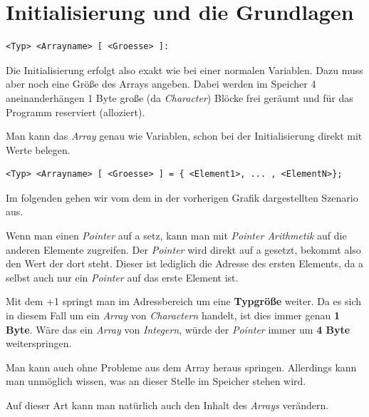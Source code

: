 \documentclass[c_worksheet.tex]{subfiles}
\begin{document}
\section{Initialisierung und die Grundlagen} 

\begin{lstlisting}
<Typ> <Arrayname> [ <Groesse> ]:
\end{lstlisting}

Die Initialisierung erfolgt also exakt wie bei einer normalen Variablen. Dazu muss aber noch eine Größe des Arrays angeben. Dabei werden im Speicher 4 aneinanderhängen 1 Byte große (da \emph{Character}) Blöcke frei geräumt und für das Programm reserviert (alloziert).

Man kann das \emph{Array} genau wie Variablen, schon bei der Initialisierung direkt mit Werte belegen.

\begin{lstlisting}
<Typ> <Arrayname> [ <Groesse> ] = { <Element1>, ... , <ElementN>};
\end{lstlisting}

Im folgenden gehen wir vom dem in der vorherigen Grafik dargestellten Szenario aus.

 

Wenn man einen \emph{Pointer} auf a setz, kann man mit \emph{Pointer Arithmetik} auf die anderen Elemente zugreifen. Der \emph{Pointer} wird direkt auf a gesetzt, bekommt also den Wert der dort steht. Dieser ist lediglich die Adresse des ersten Elements, da a selbst auch nur ein \emph{Pointer} auf das erste Element ist.

 

Mit dem +1 springt man im Adressbereich um eine \textbf{Typgröße} weiter. Da es sich in diesem Fall um ein \emph{Array} von \emph{Charactern} handelt, ist dies immer genau \textbf{1 Byte}. Wäre das ein \emph{Array} von \emph{Integern}, würde der \emph{Pointer} immer um \textbf{4 Byte} weiterspringen.

Man kann auch ohne Probleme aus dem Array heraus springen. Allerdings kann man unmöglich wissen, was an dieser Stelle im Speicher stehen wird.

 

Auf dieser Art kann man natürlich auch den Inhalt des \emph{Arrays} verändern.
\end{document}
